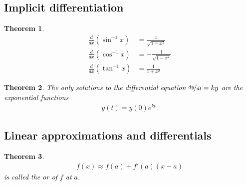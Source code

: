 \documentclass{article}
\theoremstyle{sltheorem}
\newtheorem{theorem}{Theorem}[section]
\begin{document}
\subsection{Implicit differentiation}
\begin{theorem}
    \\
    \begin{align*}
        \frac{d}{dx}(\sin^{-1}x)&=\frac{1}{\sqrt{1-x^2}}\\
        \frac{d}{dx}(\cos^{-1}x)&=-\frac{1}{\sqrt{1-x^2}}\\
        \frac{d}{dx}(\tan^{-1}x)&=\frac{1}{1+x^2}
    \end{align*}
\end{theorem}
\begin{theorem}
    The only solutions to the differential equation $\nicefrac{dy}{dt}=ky$ are the exponential functions
    \begin{align*}
        y(t)=y(0)e^{kt}.
    \end{align*}
\end{theorem}
\setcounter{subsection}{9}
\subsection{Linear approximations and differentials}
\begin{theorem}
    \begin{align*}
        f(x)\approx f(a)+f'(a)(x-a)
    \end{align*}
    is called the  or  of $f$ at $a$.
\end{theorem}
\end{document}
